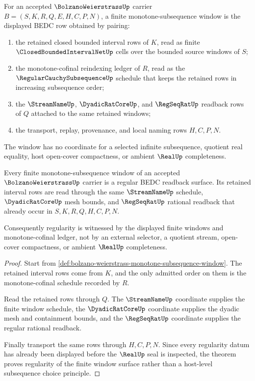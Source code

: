 \begin{definition}
\label{def:bolzano-weierstrass-monotone-subsequence-window}
For an accepted $\BolzanoWeierstrassUp$ carrier $B=(S,K,R,Q,E,H,C,P,N)$, a finite monotone-subsequence window is the displayed BEDC row obtained by pairing:
\begin{enumerate}
\item the retained closed bounded interval rows of $K$, read as finite $\ClosedBoundedIntervalNetUp$ cells over the bounded source windows of $S$;
\item the monotone-cofinal reindexing ledger of $R$, read as the $\RegularCauchySubsequenceUp$ schedule that keeps the retained rows in increasing subsequence order;
\item the $\StreamNameUp$, $\DyadicRatCoreUp$, and $\RegSeqRatUp$ readback rows of $Q$ attached to the same retained windows;
\item the transport, replay, provenance, and local naming rows $H,C,P,N$.
\end{enumerate}
The window has no coordinate for a selected infinite subsequence, quotient real equality, host open-cover compactness, or ambient $\RealUp$ completeness.
\end{definition}

\begin{theorem}
\label{thm:bolzano-weierstrass-monotone-window-regularity}
Every finite monotone-subsequence window of an accepted $\BolzanoWeierstrassUp$ carrier is a regular BEDC readback surface. Its retained interval rows are read through the same $\StreamNameUp$ schedule, $\DyadicRatCoreUp$ mesh bounds, and $\RegSeqRatUp$ rational readback that already occur in $S,K,R,Q,H,C,P,N$.

Consequently regularity is witnessed by the displayed finite windows and monotone-cofinal ledger, not by an external selector, a quotient stream, open-cover compactness, or ambient $\RealUp$ completeness.
\end{theorem}
\begin{proof}
Start from \autoref{def:bolzano-weierstrass-monotone-subsequence-window}. The retained interval rows come from $K$, and the only admitted order on them is the monotone-cofinal schedule recorded by $R$.

Read the retained rows through $Q$. The $\StreamNameUp$ coordinate supplies the finite window schedule, the $\DyadicRatCoreUp$ coordinate supplies the dyadic mesh and containment bounds, and the $\RegSeqRatUp$ coordinate supplies the regular rational readback.

Finally transport the same rows through $H,C,P,N$. Since every regularity datum has already been displayed before the $\RealUp$ seal is inspected, the theorem proves regularity of the finite window surface rather than a host-level subsequence choice principle.
\end{proof}

